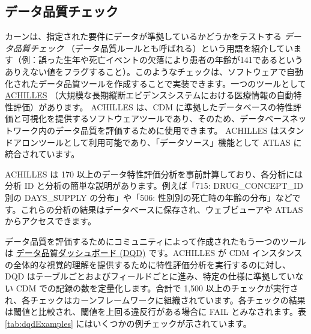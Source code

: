 \documentclass[
  11pt]{book}
\theoremstyle{definition}
\theoremstyle{definition}
\theoremstyle{definition}
\theoremstyle{definition}
\theoremstyle{remark}
\begin{document}
 

\subsection{データ品質チェック}\label{ux30c7ux30fcux30bfux54c1ux8ceaux30c1ux30a7ux30c3ux30af}

 

カーンは、指定された要件にデータが準拠しているかどうかをテストする \emph{データ品質チェック} （データ品質ルールとも呼ばれる）という用語を紹介しています（例：誤った生年や死亡イベントの欠落により患者の年齢が141であるというありえない値をフラグすること）。このようなチェックは、ソフトウェアで自動化されたデータ品質ツールを作成することで実装できます。一つのツールとして \href{https://github.com/OHDSI/Achilles}{ACHILLES} （大規模な長期縦断エビデンスシステムにおける医療情報の自動特性評価）があります。 \citep{huser_methods_2018} ACHILLES は、CDM に準拠したデータベースの特性評価と可視化を提供するソフトウェアツールであり、そのため、データベースネットワーク内のデータ品質を評価するために使用できます。 \citep{huser_multisite_2016} ACHILLES はスタンドアロンツールとして利用可能であり、「データソース」機能として ATLAS に統合されています。  

ACHILLES は 170 以上のデータ特性評価分析を事前計算しており、各分析には分析 ID と分析の簡単な説明があります。例えば「715: DRUG\_CONCEPT\_ID 別の DAYS\_SUPPLY の分布」や「506: 性別別の死亡時の年齢の分布」などです。これらの分析の結果はデータベースに保存され、ウェブビューアや ATLAS からアクセスできます。


データ品質を評価するためにコミュニティによって作成されたもう一つのツールは \href{https://github.com/OHDSI/DataQualityDashboard}{データ品質ダッシュボード (DQD)} です。ACHILLES が CDM インスタンスの全体的な視覚的理解を提供するために特性評価分析を実行するのに対し、DQD はテーブルごとおよびフィールドごとに進み、特定の仕様に準拠していない CDM での記録の数を定量化します。合計で 1,500 以上のチェックが実行され、各チェックはカーンフレームワークに組織されています。各チェックの結果は閾値と比較され、閾値を上回る違反行がある場合に FAIL とみなされます。表 \ref{tab:dqdExamples} にはいくつかの例チェックが示されています。
\end{document}
